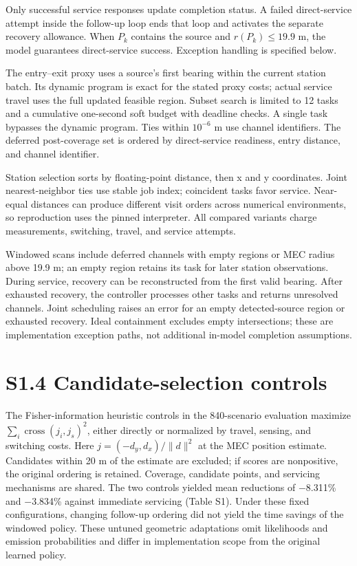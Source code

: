 \documentclass[11pt,letterpaper]{article}
\begin{document}
Only successful service responses update completion status. A failed direct-service attempt inside the follow-up loop ends that loop and activates the separate recovery allowance. When $P_k$ contains the source and $r(P_k)\le19.9$ m, the model guarantees direct-service success. Exception handling is specified below.

The entry--exit proxy uses a source's first bearing within the current station batch. Its dynamic program is exact for the stated proxy costs; actual service travel uses the full updated feasible region. Subset search is limited to 12 tasks and a cumulative one-second soft budget with deadline checks. A single task bypasses the dynamic program. Ties within $10^{-6}$ m use channel identifiers. The deferred post-coverage set is ordered by direct-service readiness, entry distance, and channel identifier.

Station selection sorts by floating-point distance, then x and y coordinates. Joint nearest-neighbor ties use stable job index; coincident tasks favor service. Near-equal distances can produce different visit orders across numerical environments, so reproduction uses the pinned interpreter. All compared variants charge measurements, switching, travel, and service attempts.

Windowed scans include deferred channels with empty regions or MEC radius above 19.9 m; an empty region retains its task for later station observations. During service, recovery can be reconstructed from the first valid bearing. After exhausted recovery, the controller processes other tasks and returns unresolved channels. Joint scheduling raises an error for an empty detected-source region or exhausted recovery. Ideal containment excludes empty intersections; these are implementation exception paths, not additional in-model completion assumptions.

\section*{S1.4 Candidate-selection controls}

The Fisher-information heuristic controls \cite{sref3} in the 840-scenario evaluation maximize $\sum_i\operatorname{cross}(j_i,j_s)^2$, either directly or normalized by travel, sensing, and switching costs. Here $j=(-d_y,d_x)/\lVert d\rVert^2$ at the MEC position estimate. Candidates within 20 m of the estimate are excluded; if scores are nonpositive, the original ordering is retained. Coverage, candidate points, and servicing mechanisms are shared. The two controls yielded mean reductions of \ensuremath{-}8.311\% and \ensuremath{-}3.834\% against immediate servicing (Table S1). Under these fixed configurations, changing follow-up ordering did not yield the time savings of the windowed policy. These untuned geometric adaptations omit likelihoods and emission probabilities and differ in implementation scope from the original learned policy.
\end{document}

